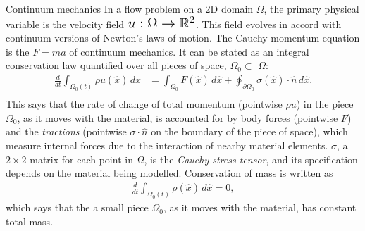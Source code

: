 \documentclass{article}
\begin{document}
\newcommand{\norm}[1]{\left\Vert#1\right\Vert}
{\large Continuum mechanics}
\vskip 0.2in
\noindent
In a flow problem on a 2D domain {\Large $\Omega$}, the primary physical variable is the velocity field $\text{\Large $u : \Omega \rightarrow \mathbb{R}^2$}$.
This field evolves in accord with continuum versions of Newton's laws of motion.
The Cauchy momentum equation is the {\large $F = ma$} of continuum mechanics. It can be stated as an integral conservation law quantified
over all pieces of space, $\Omega_0 \subset $ {\Large $\Omega$}:
\begin{align*}
\frac{d}{dt} \int_{\Omega_0(t)} \rho u(\hat{x}) \,d\hat{x} &= \int_{\Omega_0}F(\hat{x})\,d\hat{x} + \oint_{\partial \Omega_0} \sigma(\hat{x})\cdot\hat{n}\,d\hat{x}.\\
\end{align*}
This says that the rate of change of total momentum (pointwise $\rho u$) in the piece $\Omega_0$, as it moves with the material,
is accounted for by body forces (pointwise $F$) and the \textit{tractions} (pointwise $\sigma\cdot\hat{n}$ on the boundary of the piece of space),
which measure internal forces due to the interaction of nearby material elements. $\sigma$, a $2\times 2$ matrix for each point in $\Omega$, is the \textit{Cauchy stress tensor}, and its specification
depends on the material being modelled. Conservation of mass is written as
\begin{align*}
\frac{d}{dt} \int_{\Omega_0(t)} \rho(\hat{x})\,d\hat{x} = 0,
\end{align*}
which says that the a small piece $\Omega_0$, as it moves with the material, has constant total mass.
\end{document}
